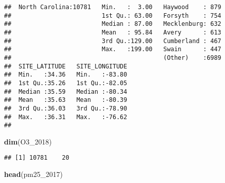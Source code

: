 \documentclass[]{article}
\newenvironment{Shaded}{\begin{snugshade}}{\end{snugshade}}
\newcommand{\KeywordTok}[1]{\textcolor[rgb]{0.13,0.29,0.53}{\textbf{#1}}}
\newcommand{\DecValTok}[1]{\textcolor[rgb]{0.00,0.00,0.81}{#1}}
\newcommand{\NormalTok}[1]{#1}
\begin{document}
\begin{verbatim}
##  North Carolina:10781   Min.   :  3.00   Haywood    : 879  
##                         1st Qu.: 63.00   Forsyth    : 754  
##                         Median : 87.00   Mecklenburg: 632  
##                         Mean   : 95.84   Avery      : 613  
##                         3rd Qu.:129.00   Cumberland : 467  
##                         Max.   :199.00   Swain      : 447  
##                                          (Other)    :6989  
##  SITE_LATITUDE   SITE_LONGITUDE  
##  Min.   :34.36   Min.   :-83.80  
##  1st Qu.:35.26   1st Qu.:-82.05  
##  Median :35.59   Median :-80.34  
##  Mean   :35.63   Mean   :-80.39  
##  3rd Qu.:36.03   3rd Qu.:-78.90  
##  Max.   :36.31   Max.   :-76.62  
## 
\end{verbatim}

\begin{Shaded}
\begin{Highlighting}[]
\KeywordTok{dim}\NormalTok{(O3_}\DecValTok{2018}\NormalTok{)}
\end{Highlighting}
\end{Shaded}

\begin{verbatim}
## [1] 10781    20
\end{verbatim}

\begin{Shaded}
\begin{Highlighting}[]
\KeywordTok{head}\NormalTok{(pm25_}\DecValTok{2017}\NormalTok{)}
\end{Highlighting}
\end{Shaded}
\end{document}
